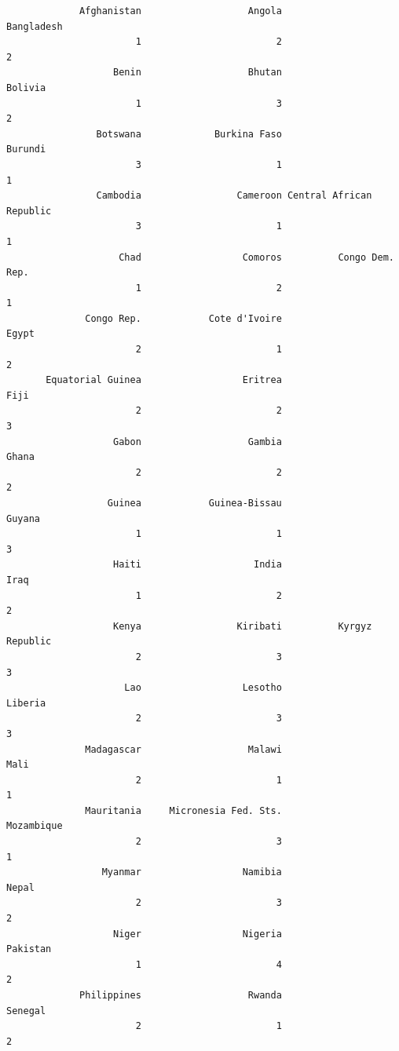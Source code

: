 \documentclass[
]{article}
\begin{document}
\begin{verbatim}
             Afghanistan                   Angola               Bangladesh 
                       1                        2                        2 
                   Benin                   Bhutan                  Bolivia 
                       1                        3                        2 
                Botswana             Burkina Faso                  Burundi 
                       3                        1                        1 
                Cambodia                 Cameroon Central African Republic 
                       3                        1                        1 
                    Chad                  Comoros          Congo Dem. Rep. 
                       1                        2                        1 
              Congo Rep.            Cote d'Ivoire                    Egypt 
                       2                        1                        2 
       Equatorial Guinea                  Eritrea                     Fiji 
                       2                        2                        3 
                   Gabon                   Gambia                    Ghana 
                       2                        2                        2 
                  Guinea            Guinea-Bissau                   Guyana 
                       1                        1                        3 
                   Haiti                    India                     Iraq 
                       1                        2                        2 
                   Kenya                 Kiribati          Kyrgyz Republic 
                       2                        3                        3 
                     Lao                  Lesotho                  Liberia 
                       2                        3                        3 
              Madagascar                   Malawi                     Mali 
                       2                        1                        1 
              Mauritania     Micronesia Fed. Sts.               Mozambique 
                       2                        3                        1 
                 Myanmar                  Namibia                    Nepal 
                       2                        3                        2 
                   Niger                  Nigeria                 Pakistan 
                       1                        4                        2 
             Philippines                   Rwanda                  Senegal 
                       2                        1                        2 

\end{verbatim}
\end{document}
